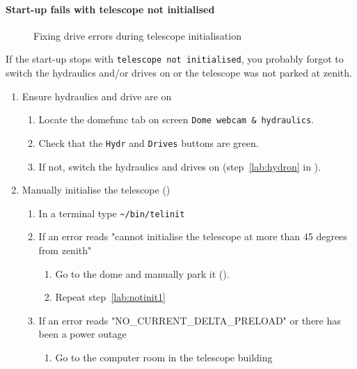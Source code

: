 \documentclass[11pt,fleqn,a4paper]{book}
\def\home{\textasciitilde{}}
\begin{document}
\paragraph{Start-up fails with telescope not initialised}
\begin{figure}[t]
\hfill
{}
\caption{Fixing drive errors during telescope initialisation}
\label{fig:drives}
\end{figure}
If the start-up stops with \texttt{telescope not initialised}, you probably forgot to switch the hydraulics and/or drives on or the telescope was not parked at zenith. 

\begin{enumerate}
    \item Ensure hydraulics and drive are on
        \begin{enumerate}
            \item Locate the \gls{domefunc} tab on screen \texttt{Dome webcam \& hydraulics}. 
            \item Check that the \texttt{Hydr} and \texttt{Drives} buttons are green.
            \item If not, switch the hydraulics and drives on (step~\ref{lab:hydron} in ).
        \end{enumerate}
    \item Manually initialise the telescope ()
        \begin{enumerate}
            \item\label{lab:notinit1} 
                In a terminal type \texttt{\home/bin/telinit}
            \item If an error reads "cannot initialise the 
                telescope at more than 45 degrees from zenith"
                \begin{enumerate}
                    \item Go to the dome and manually park it (). 
                    \item Repeat step~\ref{lab:notinit1}
                \end{enumerate}
            \item If an error reads "NO\_CURRENT\_DELTA\_PRELOAD" or there has been a power outage
                \begin{enumerate}
                    \item Go to the computer room in the telescope building

\end{enumerate}
\end{enumerate}
\end{enumerate}
\end{document}
